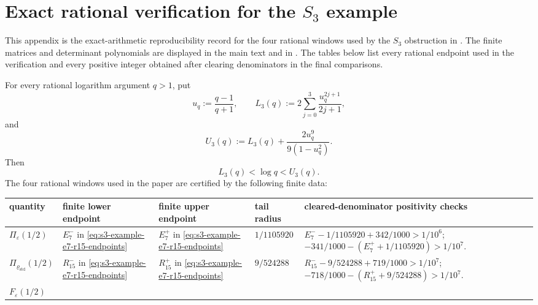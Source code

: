 \section[Exact rational verification for the S3 example]{Exact
  rational verification for the \texorpdfstring{$S_3$}{S3}
  example}
\label{app:s3-log-certificates}

This appendix is the exact-arithmetic reproducibility record for the four
rational windows used by the \(S_3\) obstruction in .  The
finite matrices and determinant polynomials are displayed in the main text and
in .  The tables below list every rational
endpoint used in the verification and every positive integer obtained after
clearing denominators in the final comparisons.

\begin{remark}
\label{prop:s3-compact-rational-verification-record}
  For every rational logarithm argument \(q>1\), put
  \[
    u_q:=\frac{q-1}{q+1},\qquad
    L_3(q):=2\sum_{j=0}^{3}\frac{u_q^{2j+1}}{2j+1},
  \]
  and
  \[
    U_3(q):=L_3(q)+\frac{2u_q^9}{9(1-u_q^2)}.
  \]
  Then
  \begin{equation}\label{eq:s3-log-lower-upper-bounds}
    L_3(q)<\log q<U_3(q).
  \end{equation}
  The four rational windows used in the paper are certified by the following
  finite data:
  \begin{center}
  \scriptsize
  \begin{tabular}{@{}L{0.16\textwidth}L{0.18\textwidth}L{0.18\textwidth}L{0.12\textwidth}L{0.28\textwidth}@{}}
    \toprule
    \textbf{quantity} & \textbf{finite lower endpoint} &
    \textbf{finite upper endpoint} & \textbf{tail radius} &
    \textbf{cleared-denominator positivity checks}\\
    \midrule
    \(\Pi_\varepsilon(1/2)\) &
      \(E_7^-\) in \eqref{eq:s3-example-e7-r15-endpoints} &
      \(E_7^+\) in \eqref{eq:s3-example-e7-r15-endpoints} &
      \(1/1105920\) &
      \(E_7^- -1/1105920+342/1000>1/10^6\);
      \(-341/1000-(E_7^+ +1/1105920)>1/10^7\).\\[1.0ex]
    \(\Pi_{\varrho_{\mathrm{std}}}(1/2)\) &
      \(R_{15}^-\) in \eqref{eq:s3-example-e7-r15-endpoints} &
      \(R_{15}^+\) in \eqref{eq:s3-example-e7-r15-endpoints} &
      \(9/524288\) &
      \(R_{15}^- -9/524288+719/1000>1/10^7\);
      \(-718/1000-(R_{15}^+ +9/524288)>1/10^7\).\\[1.0ex]
    \(F_\varepsilon(1/2)\) &

\end{tabular}
\end{center}
\end{remark}
